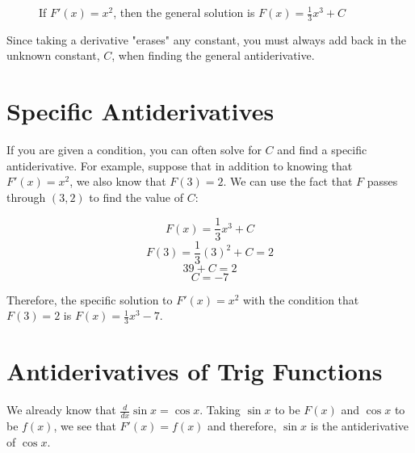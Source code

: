 \begin{figure}[htbp]
	\centering
	\caption{If $F'(x) = x^2$, then the general solution is $F(x) = \frac{1}{3}x^3+C$}
	\label{fig:antideriv}
\end{figure} 

Since taking a derivative "erases" any constant, you must always add 
back in the unknown constant, $C$, when finding the general 
antiderivative. 

\section{Specific Antiderivatives}
If you are given a condition, you can often solve for $C$ and find a 
specific antiderivative. For example, suppose that in addition to 
knowing that $F'(x) = x^2$, we also know that $F(3) = 2$. We can use 
the fact that $F$ passes through $(3, 2)$ to find the value of $C$:

$$F(x) = \frac{1}{3} x^3 + C$$
$$F(3) = \frac{1}{3} (3)^2 + C = 2$$
$$39 + C = 2$$
$$C = -7$$

Therefore, the specific solution to $F'(x) = x^2$ with the condition 
that $F(3) =2$ is $F(x) = \frac{1}{3} x^3 - 7$. 

\section{Antiderivatives of Trig Functions}
We already know that $\frac{d}{dx} \sin{x} = \cos{x}$. Taking $\sin{x}$ 
to be $F(x)$ and $\cos{x}$ to be $f(x)$, we see that $F'(x) = f(x)$ 
and therefore, $\sin{x}$ is the antiderivative of $\cos{x}$. 

